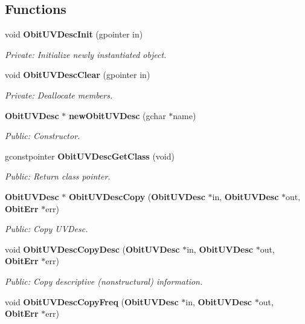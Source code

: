 \subsection*{Functions}
\begin{CompactItemize}
\item 
void {\bf Obit\-UVDesc\-Init} (gpointer in)
\begin{CompactList}\small\item\em Private: Initialize newly instantiated object. \item\end{CompactList}\item 
void {\bf Obit\-UVDesc\-Clear} (gpointer in)
\begin{CompactList}\small\item\em Private: Deallocate members. \item\end{CompactList}\item 
{\bf Obit\-UVDesc} $\ast$ {\bf new\-Obit\-UVDesc} (gchar $\ast$name)
\begin{CompactList}\small\item\em Public: Constructor. \item\end{CompactList}\item 
gconstpointer {\bf Obit\-UVDesc\-Get\-Class} (void)
\begin{CompactList}\small\item\em Public: Return class pointer. \item\end{CompactList}\item 
{\bf Obit\-UVDesc} $\ast$ {\bf Obit\-UVDesc\-Copy} ({\bf Obit\-UVDesc} $\ast$in, {\bf Obit\-UVDesc} $\ast$out, {\bf Obit\-Err} $\ast$err)
\begin{CompactList}\small\item\em Public: Copy UVDesc. \item\end{CompactList}\item 
void {\bf Obit\-UVDesc\-Copy\-Desc} ({\bf Obit\-UVDesc} $\ast$in, {\bf Obit\-UVDesc} $\ast$out, {\bf Obit\-Err} $\ast$err)
\begin{CompactList}\small\item\em Public: Copy descriptive (nonstructural) information. \item\end{CompactList}\item 
void {\bf Obit\-UVDesc\-Copy\-Freq} ({\bf Obit\-UVDesc} $\ast$in, {\bf Obit\-UVDesc} $\ast$out, {\bf Obit\-Err} $\ast$err)

\end{CompactItemize}

